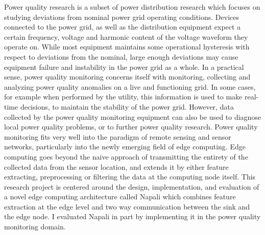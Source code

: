 Power quality research is a subset of power distribution research which focuses on studying deviations from nominal power grid operating conditions.
Devices connected to the power grid, as well as the distribution equipment expect a certain frequency, voltage and harmonic content of the voltage waveform they operate on.
While most equipment maintains some operational hysteresis with respect to deviations from the nominal, large enough deviations may cause equipment failure and instability in the power grid as a whole.
In a practical sense, power quality monitoring concerns itself with monitoring, collecting and analyzing power quality anomalies on a live and functioning grid.
In some cases, for example when performed by the utility, this information is used to make real-time decisions, to maintain the stability of the power grid.
However, data collected by the power quality monitoring equipment can also be used to diagnose local power quality problems, or to further power quality research.
Power quality monitoring fits very well into the paradigm of remote sensing and sensor networks, particularly into the newly emerging field of edge computing.
Edge computing goes beyond the naive approach of transmitting the entirety of the collected data from the sensor location, and extends it by either feature extracting, preprocessing or filtering the data at the computing node itself.
This research project is centered around the design, implementation, and evaluation of a novel edge computing architecture called Napali which combines feature extraction at the edge level and two way communication between the sink and the edge node.
I evaluated Napali in part by implementing it in the power quality monitoring domain.

